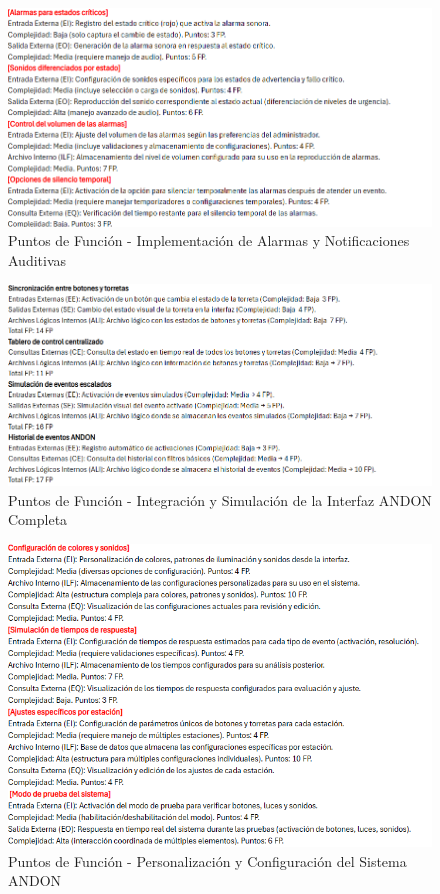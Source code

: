 \documentclass[12pt,letterpaper,spanish, xcolor=table]{report}
\numberwithin{figure}{subsection}
\begin{document}
	\begin{figure}[H]
		\centering
		\includegraphics[width=1.0\textwidth]
		{Imagenes/PathAyuda/FpsAlarmasNotifiaciones.png}
		\caption{Puntos de Función - Implementación de Alarmas y Notificaciones Auditivas 
		}\label{a2}
	\end{figure}
	
	\begin{figure}[H]
		\centering
		\includegraphics[width=1.0\textwidth]
		{Imagenes/PathAyuda/FpsSimulacion.png}
		\caption{Puntos de Función - Integración y Simulación de la Interfaz ANDON Completa 
		}\label{a2}
	\end{figure}
	
	\begin{figure}[H]
		\centering
		\includegraphics[width=1.0\textwidth]
		{Imagenes/PathAyuda/FpsPersonalizacionAndon.png}
		\caption{Puntos de Función - Personalización y Configuración del Sistema ANDON
		}\label{a2}
	\end{figure}
	
\end{document}
